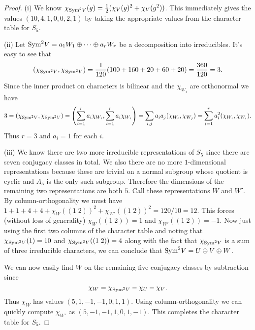 \documentclass{article}
\newcommand{\sym}{\textup{Sym}}
\begin{document}
\begin{proof}
(i) We know $\chi_{\sym^2 V}(g) = \frac{1}{2} (\chi_V(g)^2 + \chi_V(g^2))$. This immediately gives the values $(10, 4, 1, 0, 0, 2, 1)$ by taking the appropriate values from the character table for $S_5$.

(ii) Let $\sym^2 V = a_1W_1 \oplus \dots \oplus a_rW_r$ be a decomposition into irreducibles. It's easy to see that
\[
(\chi_{\sym^2V}, \chi_{\sym^2V}) = \frac{1}{120}(100 + 160 + 20 + 60 + 20) = \frac{360}{120} = 3.
\]
Since the inner product on characters is bilinear and the $\chi_{W_i}$ are orthonormal we have
\[
3 = (\chi_{\sym^2V}, \chi_{\sym^2V}) = \left ( \sum_{i=1}^{r} a_i\chi_{W_i}, \sum_{i=1}^{r} a_i\chi_{W_i} \right ) = \sum_{i,j} a_ia_j(\chi_{W_i}, \chi_{W_j}) = \sum_{i=1}^r a_i^2(\chi_{W_i}, \chi_{W_i}).
\]
Thus $r = 3$ and $a_i = 1$ for each $i$.

(iii) We know there are two more irreducible representations of $S_5$ since there are seven conjugacy classes in total. We also there are no more $1$-dimensional representations because these are trivial on a normal subgroup whose quotient is cyclic and $A_5$ is the only such subgroup. Therefore the dimensions of the remaining two representations are both $5$. Call these representations $W$ and $W'$. By column-orthogonality we must have $1 + 1 + 4 + 4 + \chi_W((1 \; 2))^2 + \chi_{W'}((1 \; 2))^2 = 120/10 = 12$. This forces (without loss of generality) $\chi_W((1 \; 2)) = 1$ and $\chi_{W'}((1 \; 2)) = -1$. Now just using the first two columns of the character table and noting that $\chi_{\sym^2V}(1) = 10$ and $\chi_{\sym^2V}((1 \; 2)) = 4$ along with the fact that $\chi_{\sym^2V}$ is a sum of three irreducible characters, we can conclude that $\sym^2 V = U \oplus V \oplus W$.

We can now easily find $W$ on the remaining five conjugacy classes by subtraction since
\[
\chi_W = \chi_{\sym^2V} - \chi_U - \chi_V.
\]
Thus $\chi_W$ has values $(5, 1, -1, -1, 0, 1, 1)$. Using column-orthogonality we can quickly compute $\chi_{W'}$ as $(5, -1, -1, 1, 0, 1 , -1)$. This completes the character table for $S_5$.
\end{proof}
\end{document}

